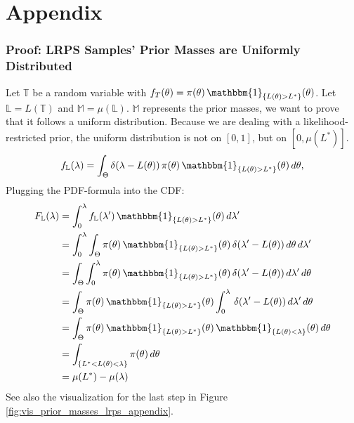 \documentclass[12pt, a4paper]{report}
\begin{document}
\clearpage
{}
\printbibliography


\clearpage
\chapter*{Appendix}
\subsection*{Proof: LRPS Samples' Prior Masses are Uniformly Distributed}
Let $\mathbb{T}$ be a random variable with $f_T(\theta) = \pi(\theta) \, \mathbbm{1}_{\{L(\theta)>L^*\}}(\theta)$.
Let $\mathbb{L} = L(\mathbb{T})$ and $\mathbb{M} = \mu(\mathbb{L})$.
$\mathbb{M}$ represents the prior masses, we want to prove that it follows a uniform distribution.
Because we are dealing with a likelihood-restricted prior, the uniform distribution is not on $[0,1]$, but on $[0, \mu(L^*)]$.
\begin{equation*}
    f_\mathbb{L}(\lambda) = \int_\Theta \delta(\lambda - L(\theta)) \, \pi(\theta) \, \mathbbm{1}_{\{L(\theta)>L^*\}}(\theta) \, d\theta,
\end{equation*}
Plugging the PDF-formula into the CDF:
\begin{align}
    F_\mathbb{L}(\lambda) &= \int_0^\lambda f_\mathbb{L}(\lambda') \, \mathbbm{1}_{\{L(\theta)>L^*\}}(\theta) \, d\lambda' \nonumber\\
    &= \int_0^\lambda \int_\Theta \pi(\theta) \, \mathbbm{1}_{\{L(\theta)>L^*\}}(\theta) \, \delta(\lambda' - L(\theta)) \, d\theta \, d\lambda' \nonumber\\
    &= \int_\Theta \int_0^\lambda \pi(\theta) \, \mathbbm{1}_{\{L(\theta)>L^*\}}(\theta) \, \delta(\lambda' - L(\theta)) \, d\lambda'\, d\theta \nonumber\\
    &= \int_\Theta \pi(\theta) \, \mathbbm{1}_{\{L(\theta)>L^*\}}(\theta) \int_0^\lambda \, \delta(\lambda' - L(\theta)) \, d\lambda' \, d\theta \nonumber\\
    &= \int_\Theta \pi(\theta) \, \mathbbm{1}_{\{L(\theta)>L^*\}}(\theta) \, \mathbbm{1}_{\{L(\theta) < \lambda\}}(\theta) \, d\theta \nonumber\\
    &= \int_{\{L^* < L(\theta) < \lambda\}} \pi(\theta)\, d\theta \label{eq:prior_mass_integral_appendix}\\
    &= \mu(L^*) - \mu(\lambda) \nonumber
\end{align}
See also the visualization for the last step in Figure \ref{fig:vis_prior_masses_lrps_appendix}.
\end{document}
